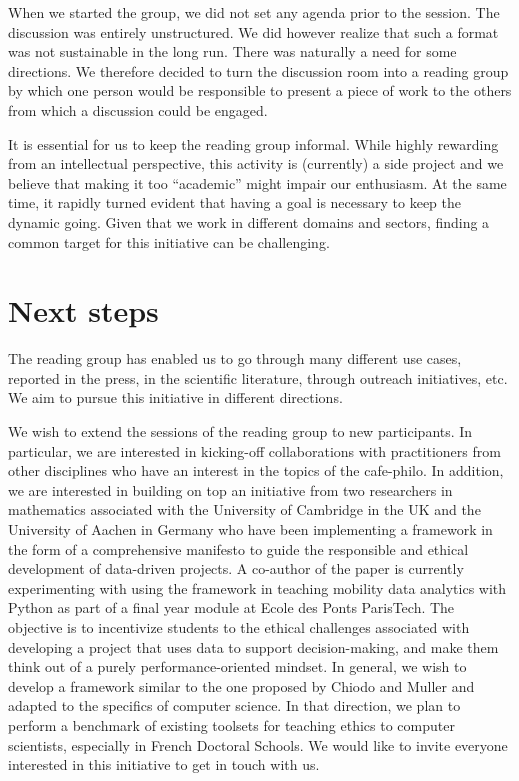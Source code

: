 \documentclass[conference]{IEEEtran}
\begin{document}
When we  started the  group, we did  not set any  agenda prior  to the
session.  The discussion  was  entirely unstructured.  We did  however
realize that such a format was  not sustainable in the long run. There
was naturally a need for some directions. We therefore decided to turn
the discussion room into a reading  group by which one person would be
responsible to  present a  piece of  work to the  others from  which a
discussion could be engaged.

It  is essential  for us  to keep  the reading  group informal.  While
highly rewarding  from an  intellectual perspective, this  activity is
(currently)  a  side  project  and  we  believe  that  making  it  too
“academic” might impair  our enthusiasm. At the same  time, it rapidly
turned evident  that having a  goal is  necessary to keep  the dynamic
going. Given that we work in  different domains and sectors, finding a
common target for this initiative can be challenging.

\section{Next steps}

The reading group has enabled us to go through many different use cases, reported in the press, in the scientific literature, through outreach initiatives, etc. We aim to pursue this initiative in different directions.

We wish to extend the sessions of the reading group to new participants. In particular, we are interested in kicking-off collaborations with practitioners from other disciplines who have an interest in the topics of the cafe-philo. In addition, we are interested in building on top an initiative from two researchers in mathematics associated with the University of Cambridge in the UK and the University of Aachen in Germany who have been implementing a framework in the form of a comprehensive manifesto \cite{chiodo23} to guide the responsible and ethical development of data-driven projects. A co-author of the paper is currently experimenting with using the framework in teaching mobility data analytics with Python as part of a final year module at Ecole des Ponts ParisTech. The objective is to incentivize students to the ethical challenges associated with developing a project that uses data to support decision-making, and make them think out of a purely performance-oriented mindset. In general, we wish to develop a framework similar to the one proposed by Chiodo and Muller and adapted to the specifics of computer science. In that direction, we plan to perform a benchmark of existing toolsets for teaching ethics to computer scientists, especially in French Doctoral Schools. We would like to invite everyone interested in this initiative to get in touch with us.      
\end{document}
